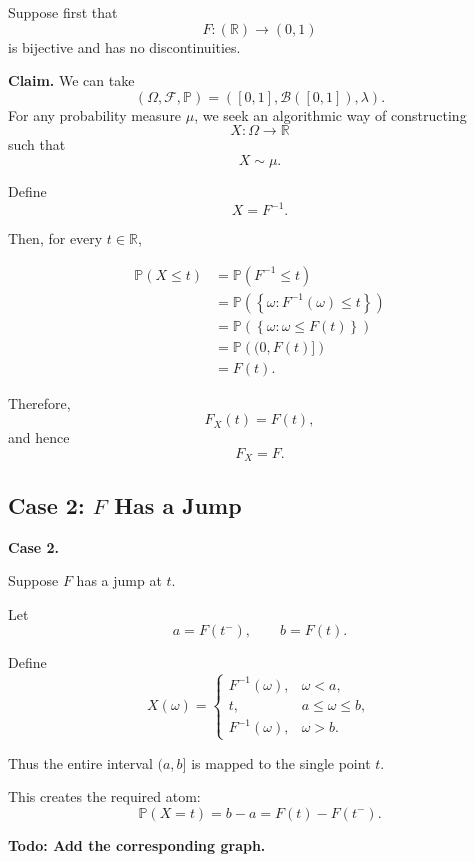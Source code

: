 Suppose first that
\[
F:(\mathbb{R})\longrightarrow(0,1)
\]
is bijective and has no discontinuities.

\medskip
\noindent\textbf{Claim.}
We can take
\[
(\Omega,\mathcal{F},\mathbb{P})
=
([0,1],\mathcal{B}([0,1]),\lambda).
\]
\medskip
For any probability measure $\mu$, we seek an algorithmic way of
constructing
\[
X:\Omega\longrightarrow\mathbb{R}
\]
such that
\[
X\sim\mu.
\]

Define
\[
X=F^{-1}.
\]

Then, for every $t\in\mathbb{R}$,

\[
\begin{aligned}
\mathbb{P}(X\leq t)
&=
\mathbb{P}\left(F^{-1}\leq t\right)\\
&=
\mathbb{P}
\left(
\left\{
\omega:
F^{-1}(\omega)\leq t
\right\}
\right)\\
&=
\mathbb{P}
\left(
\left\{
\omega:
\omega\leq F(t)
\right\}
\right)\\
&=
\mathbb{P}\left((0,F(t)]\right)\\
&=
F(t).
\end{aligned}
\]

Therefore,
\[
F_X(t)=F(t),
\]
and hence
\[
F_X=F.
\]

\subsection{Case 2: $F$ Has a Jump}

\textbf{Case 2.}

Suppose $F$ has a jump at $t$.

Let
\[
a=F(t^-),
\qquad
b=F(t).
\]

Define
\[
X(\omega)
=
\begin{cases}
F^{-1}(\omega), & \omega<a,\\[4pt]
t, & a\leq\omega\leq b,\\[4pt]
F^{-1}(\omega), & \omega>b.
\end{cases}
\]

Thus the entire interval $(a,b]$ is mapped to the single point $t$.

This creates the required atom:
\[
\mathbb{P}(X=t)
=
b-a
=
F(t)-F(t^-).
\]

\begin{center}
    \textbf{Todo: Add the corresponding graph.}
\end{center}


